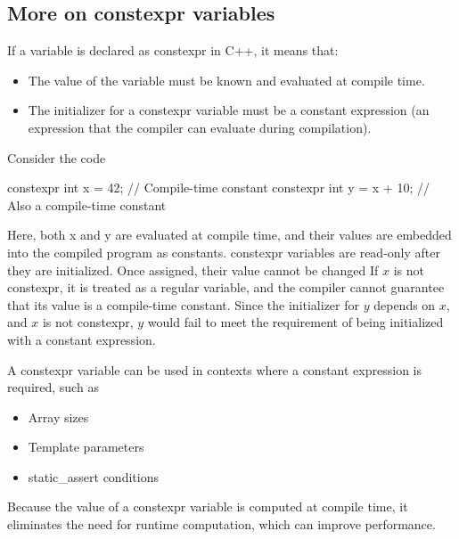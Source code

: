 \documentclass{report}
\begin{document}
 \bigbreak \noindent 
 \subsection{More on constexpr variables}
 \bigbreak \noindent 
 If a variable is declared as constexpr in C++, it means that:
 \begin{itemize}
     \item The value of the variable must be known and evaluated at compile time.
     \item The initializer for a constexpr variable must be a constant expression (an expression that the compiler can evaluate during compilation).    
 \end{itemize}
 Consider the code
 \bigbreak \noindent 
 \begin{cppcode}
     constexpr int x = 42; // Compile-time constant
     constexpr int y = x + 10; // Also a compile-time constant
 \end{cppcode}
 Here, both x and y are evaluated at compile time, and their values are embedded into the compiled program as constants.
 \bigbreak \noindent 
 constexpr variables are read-only after they are initialized. Once assigned, their value cannot be changed
 \bigbreak \noindent 
 If $x$ is not constexpr, it is treated as a regular variable, and the compiler cannot guarantee that its value is a compile-time constant.
 \bigbreak \noindent 
    Since the initializer for $y$ depends on $x$, and $x$ is not constexpr, $y$ would fail to meet the requirement of being initialized with a constant expression.



 \bigbreak \noindent 
 A constexpr variable can be used in contexts where a constant expression is required, such as
 \bigbreak \noindent 
 \begin{itemize}
     \item Array sizes
     \item Template parameters
     \item static\_assert conditions
\end{itemize}
\bigbreak \noindent 
Because the value of a constexpr variable is computed at compile time, it eliminates the need for runtime computation, which can improve performance.

\bigbreak \noindent 
\end{document}
